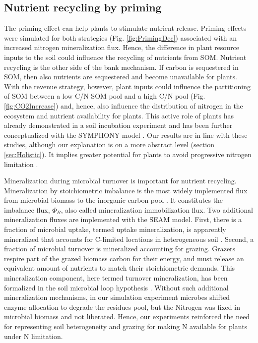 \subsection{Nutrient recycling by priming}
The priming effect can help plants to stimulate nutrient release.
Priming effects were simulated for both strategies (Fig. \ref{fig:PrimingDec})
associated with an increased nitrogen mineralization flux.
Hence, the difference in plant resource inputs to the soil could influence the
recycling of nutrients from SOM.
Nutrient recycling is the other side of the bank mechanism. If carbon is
sequestered in SOM, then also nutrients are sequestered and become unavailable
for plants.
With the revenue strategy, however, plant inputs could influence the
partitioning of SOM between a low C/N SOM pool and a high C/N pool (Fig.
\ref{fig:CO2Increase}) and, hence, also influence the distribution of nitrogen
in the ecosystem and nutrient availability for plants. This active role of
plants has already demonstrated in a soil incubation experiment
\citep{Fontaine11} and has been further conceptualized with the SYMPHONY model
\citep{Perveen14}. Our results are in line with these studies, although our
explanation is on a more abstract level (section \ref{sec:Holistic}). It implies
greater potential for plants to avoid progressive nitrogen limitation
\citep{Norby10, Franklin14, Averill15}.

Mineralization during microbial turnover is important for nutrient recycling.
Mineralization by stoichiometric imbalance is the most widely implemented flux
from microbial biomass to the inorganic carbon pool \citep{Manzoni09}. It
constitutes the imbalance flux, $\Phi_B$, also called mineralization
immobilization flux.
Two additional mineralization fluxes are implemented with the SEAM model.
First, there is a fraction of microbial uptake, termed uptake mineralization, is
apparently mineralized that accounts for C-limited locations in heterogeneous
soil \citep{Manzoni08}.
Second, a fraction of microbial turnover is mineralized accounting for grazing.
Grazers respire part of the grazed biomass carbon for their energy, and must
release an equivalent amount of nutrients to match their stoichiometric demands.
This mineralization component, here termed turnover mineralization, has been
formalized in the soil microbial loop hypothesis \citep{Clarholm85, Raynaud06}.
Without such additional mineralization mechanisms, in our simulation experiment
microbes shifted enzyme allocation to degrade the residues pool, but the
Nitrogen was fixed in microbial biomass and not liberated. Hence, our
experiments reinforced the need for representing soil heterogeneity and grazing
for making N available for plants under N limitation.


